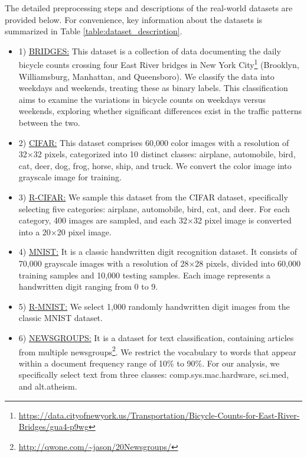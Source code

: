 The detailed preprocessing steps and descriptions of the real-world datasets are provided below. For convenience, key information about the datasets is summarized in Table \ref{table:dataset_description}.

\begin{itemize}
    \item{
        1) \underline{BRIDGES:} This dataset is a collection of data documenting the daily bicycle counts crossing four East River bridges in New York City\footnote{\url{https://data.cityofnewyork.us/Transportation/Bicycle-Counts-for-East-River-Bridges/gua4-p9wg}} (Brooklyn, Williamsburg, Manhattan, and Queensboro). We classify the data into weekdays and weekends, treating these as binary labels. This classification aims to examine the variations in bicycle counts on weekdays versus weekends, exploring whether significant differences exist in the traffic patterns between the two.
    }

     \item{
        2) \underline{CIFAR:}  This dataset comprises 60,000 color images with a resolution of 32×32 pixels, categorized into 10 distinct classes: airplane, automobile, bird, cat, deer, dog, frog, horse, ship, and truck. We convert the color image into grayscale image for training.
    }

     \item{
        3) \underline{R-CIFAR:} We sample this dataset from the CIFAR dataset, specifically selecting five categories: airplane, automobile, bird, cat, and deer. For each category, 400 images are sampled, and each 32×32 pixel image is converted into a 20×20 pixel image.
    }

     \item{
        4) \underline{MNIST:} It is a classic handwritten digit recognition dataset. It consists of 70,000 grayscale images with a resolution of 28×28 pixels, divided into 60,000 training samples and 10,000 testing samples. Each image represents a handwritten digit ranging from 0 to 9.
    }

     \item{
        5) \underline{R-MNIST:} We select 1,000 randomly handwritten digit images from the classic MNIST dataset.
    }

     \item{
        6) \underline{NEWSGROUPS:} It is a dataset for text classification, containing articles from multiple newsgroups\footnote{\url{http://qwone.com/~jason/20Newsgroups/}}. We restrict the vocabulary to words that appear within a document frequency range of 10\% to 90\%. For our analysis, we specifically select text from three classes: comp.sys.mac.hardware, sci.med, and alt.atheism.

}
\end{itemize}
